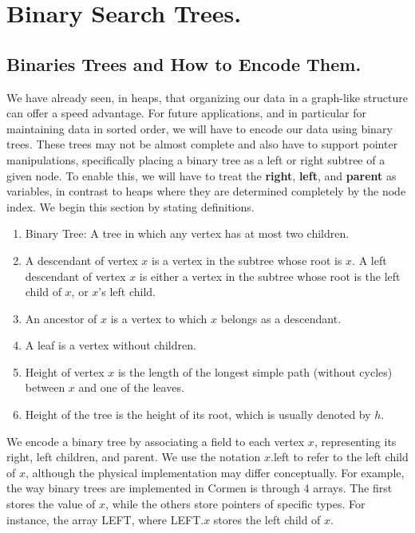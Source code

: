 


\ifdefined\BOOK
\else
\setcounter{chapter}{5}
\fi
\chapter{Binary Search Trees.} 

\section{Binaries Trees and How to Encode Them.} We have already seen, in heaps, that organizing our data in a graph-like structure can offer a speed advantage. For future applications, and in particular for maintaining data in sorted order, we will have to encode our data using binary trees. These trees may not be almost complete and also have to support pointer manipulations, specifically placing a binary tree as a left or right subtree of a given node. To enable this, we will have to treat the \textbf{right}, \textbf{left}, and \textbf{parent} as variables, in contrast to heaps where they are determined completely by the node index. We begin this section by stating definitions.


\begin{definition}
  \begin{enumerate}
    \item Binary Tree: A tree in which any vertex has at most two children.
    \item A descendant of vertex $x$ is a vertex in the subtree whose root is $x$. A left descendant of vertex $x$ is either a vertex in the subtree whose root is the left child of $x$, or $x$'s left child.
    \item An ancestor of $x$ is a vertex to which $x$ belongs as a descendant.
    \item A leaf is a vertex without children.
    \item Height of vertex $x$ is the length of the longest simple path (without cycles) between $x$ and one of the leaves.
    \item Height of the tree is the height of its root, which is usually denoted by $h$.
\end{enumerate}
\end{definition}

We encode a binary tree by associating a field to each vertex $x$, representing its right, left children, and parent. We use the notation $x$.left to refer to the left child of $x$, although the physical implementation may differ conceptually. For example, the way binary trees are implemented in Cormen is through 4 arrays. The first stores the value of $x$, while the others store pointers of specific types. For instance, the array LEFT, where LEFT.$x$ stores the left child of $x$.


